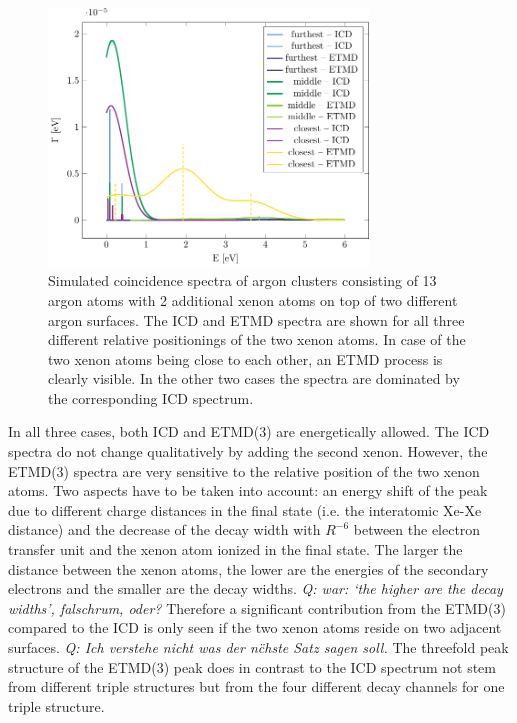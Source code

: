 \begin{figure}[h]
 \centering
 \includegraphics[width=8.5cm]{pics/2tops.pdf}
 \caption{Simulated coincidence spectra of argon clusters consisting of 13
          argon atoms with 2 additional xenon atoms on top of two different
          argon surfaces. The ICD and ETMD spectra are shown for all three
          different relative positionings of the two xenon atoms. In case of
          the two xenon atoms being close to each other, an ETMD process is
          clearly visible. In the other two cases the spectra are dominated by
          the corresponding ICD spectrum.}
 \label{figure:2tops}
\end{figure}

In all three cases, both ICD and ETMD(3) are energetically allowed. The ICD
spectra do not change qualitatively by adding the second xenon.
However, the ETMD(3) spectra
are very sensitive to the relative position of the two xenon atoms.
Two aspects have to be taken into account: an energy shift of the peak due
to different charge distances in the final state (i.e. the interatomic Xe-Xe
distance) and the decrease of the decay width with $R^{-6}$
between the electron transfer unit and the xenon atom ionized in the final state.
The larger the distance between the xenon atoms, the lower are the energies
of the secondary electrons and the smaller are the decay widths. 
{\it Q: war: `the higher are the decay widths', falschrum, oder?}
Therefore a
significant contribution from the ETMD(3) compared to the ICD is only
seen if the two xenon atoms reside on two adjacent
surfaces. 
{\it Q: Ich verstehe nicht was der n\"chste Satz sagen soll.}
The threefold peak structure of the ETMD(3) peak does in contrast to
the ICD spectrum not stem from different triple structures but from the
four different decay channels for one triple structure.

